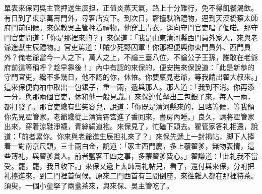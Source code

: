 單表來保同吳主管押送生辰担，正值炎蒸天氣，路上十分難行，免不得飢餐渴飲。有日到了東京萬壽門外，尋客店安下。到次日，齎擡馱箱禮物，逕到天漢橋蔡太師府門前伺候。來保教吳主管押着禮物，他穿上青衣，逕向守門官吏唱了個喏。那守門官吏問道：「你是那裡來的？」來保道：「我是山東清河縣西門員外家人，{}來與老爺進獻生辰禮物。」官吏罵道：「賊少死野囚軍！你那裡便興你東門員外、西門員外？俺老爺當今一人之下，萬人之上，不論三臺八位，不論公子王孫，誰敢在老爺府前這等稱呼？{}趁早靠後！」內中有認的來保的，便安撫來保說道：「此是新叅的守門官吏，纔不多幾日，他不認的你，休恠。你要稟見老爺，等我請出翟大叔來。」這來保便向袖中取出一包銀子，重一兩，遞與那人。那人道：「我到不消。你再添一分，與那兩個官吏，休和他一般見識。」{}來保連忙拏出三包銀子來，每人一兩，都打發了。那官吏纔有些笑容兒，說道：「你既是清河縣來的，且略等候，等我領你先見翟管家。老爺纔從上清寶霄宮進了香囘來，書房內睡。」良久，請將翟管家出來，穿着涼鞋淨襪，青絲絹道袍。來保見了，忙磕下頭去。翟管家答礼相還，說道：「前者累你。你來與老爺進生辰担礼來了？」來保先遞上一封揭帖，脚下人捧着一對南京尺頭，三十兩白金，說道：「家主西門慶，多上覆翟爹，無物表情，這些薄礼，與翟爹賞人。前者鹽客王四之事，多蒙翟爹費心。」翟謙道：「此礼我不當受。罷，罷，我且收下。」來保又遞上太師壽礼帖兒，看了，還付與來保，分咐把礼擡進來，到二門裡首伺候。原來二門西首有三間倒座，來徃雜人都在那裡待茶。須臾，一個小童拏了兩盞茶來，與來保、吳主管吃了。

